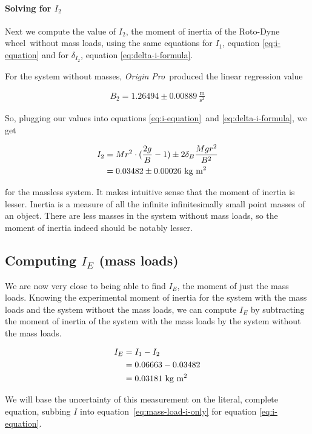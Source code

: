 \documentclass[coverpage]{article}
\newcommand{\softwareText}[1]{\textit{#1}\texttrademark}
\newcommand{\origin}{\softwareText{Origin Pro}}
\newcommand{\iUnit}{\text{kg $\text{m}^2$}}
\newcommand{\rwheel}{Roto-Dyne wheel}
\newcommand{\mpssq}{\frac{\text{m}}{\text{s}^2}}
\begin{document}
	\paragraph{Solving for $I_2$}
	
	Next we compute the value of $I_2$, the moment of inertia of the \rwheel~without mass loads, using the same equations for $I_1$, equation \ref{eq:i-equation} and for $\delta_{I_2}$, equation \ref{eq:delta-i-formula}.
	
	For the system without masses, \origin~produced the linear regression value
	
	\begin{align}
		B_2 = 1.26494 \pm 0.00889\ \mpssq \label{eq:def-b2}
	\end{align}
	
	So, plugging our values into equations \ref{eq:i-equation}~and \ref{eq:delta-i-formula}, we get
	
	\begin{align}
		I_2 &= Mr^2 \cdot (\frac{2g}{B} - 1) \pm 2 \delta_B \frac{M g r^2}{B^2} \notag \\
		&= 0.03482 \pm 0.00026\ \iUnit
	\end{align}

	for the massless system. It makes intuitive sense that the moment of inertia is lesser. Inertia is a measure of all the infinite infinitesimally small point masses of an object. There are less masses in the system without mass loads, so the moment of inertia indeed should be notably lesser.
	
	\subsection{Computing $I_E$ (mass loads)}
	
	We are now very close to being able to find $I_E$, the moment of just the mass loads. Knowing the experimental moment of inertia for the system with the mass loads and the system without the mass loads, we can compute $I_E$ by subtracting the moment of inertia of the system with the mass loads by the system without the mass loads.
	
	\begin{align}
		I_E &= I_1 - I_2 \label{eq:mass-load-i-only} \\
		&= 0.06663 - 0.03482 \notag \\
		&= 0.03181\ \iUnit
	\end{align}
	
	We will base the uncertainty of this measurement on the literal, complete equation, subbing $I$ into equation~\ref{eq:mass-load-i-only} for equation \ref{eq:i-equation}.
	
\end{document}
